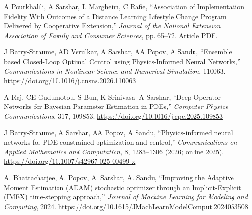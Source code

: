 \documentclass[11pt,letterpaper]{report}
\newcommand{\paperinfo}[5]{
    \tab{}
    #1, %
    \enquote{#2,} %
    \textit{#3}, %
    #4. %
    \href{#5}{#5} %
}
\begin{document}
    \begin{tablist}
    
    \item[2026] \paperinfo{A Pourkhalili, A Sarshar, L Margheim, C Rafie}
                            {Association of Implementation Fidelity With Outcomes of a Distance Learning Lifestyle Change Program Delivered by Cooperative Extension}
                            {Journal of the National Extension Association of Family and Consumer Sciences}
                            {pp. 65--72. \href{https://neafcs.memberclicks.net/assets/documents/journal/2026-jneafcs/Association\%20of\%20Implementation\%20Fidelity\%20with\%20Outcomes\%20of\%20a\%20Distance\%20Learning\%20Lifestyle\%20Change\%20Program.pdf}{Article PDF}}
                            {}

    \item[2026] \paperinfo{J Barry-Straume, AD Verulkar, A Sarshar, AA Popov, A Sandu}
                            {Ensemble based Closed-Loop Optimal Control using Physics-Informed Neural Networks}
                            {Communications in Nonlinear Science and Numerical Simulation}
                            {110063}
                            {https://doi.org/10.1016/j.cnsns.2026.110063}

    \item[2025] \paperinfo{A Raj, CE Gudumotou, S Bun, K Srinivasa, A Sarshar}
                                {Deep Operator Networks for Bayesian Parameter Estimation in PDEs}
                                {Computer Physics Communications}
                                {317, 109853}
                                {https://doi.org/10.1016/j.cpc.2025.109853}

    \item[2025] \paperinfo{J Barry-Straume, A Sarshar, AA Popov, A Sandu}
                            {Physics-informed neural networks for PDE-constrained optimization and control}
                            {Communications on Applied Mathematics and Computation}
                            {8, 1283--1306 (2026; online 2025)}
                            {https://doi.org/10.1007/s42967-025-00499-x}

    \item[2024] \paperinfo{A. Bhattacharjee, A. Popov, A. Sarshar, A. Sandu}
    {Improving the Adaptive Moment Estimation (ADAM) stochastic optimizer through an Implicit-Explicit (IMEX) time-stepping approach}
    {Journal of Machine Learning for Modeling and Computing}
    {2024}
    {https://doi.org/10.1615/JMachLearnModelComput.2024053508}


\end{tablist}
\end{document}
